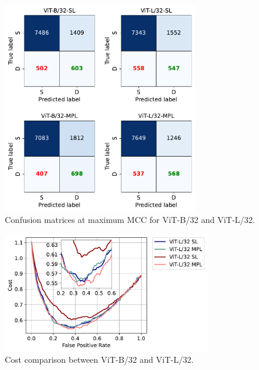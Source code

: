 \begin{figure}
    \centering
    \includegraphics[width=0.75\textwidth]{images/bdd100k/training/confusion-matrix_comp.pdf}
    \caption{Confusion matrices at maximum MCC for ViT-B/32 and ViT-L/32.}
\end{figure}

\begin{figure}[h]
    \centering
    \includegraphics[width=0.8\textwidth]{images/bdd100k/training/cost.pdf}
    \caption{Cost comparison between ViT-B/32 and ViT-L/32.}
    \label{fig:cost_100k_ul}
\end{figure}

